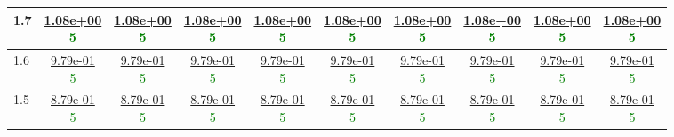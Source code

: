 \begin{table}[H]
\begin{tabular}{|l||c|c|c|c|c|c|c|c|c|}
\hline
 1.7 & \makecell{\ul{1.08e+00} \\ \textcolor{Green}{5}} & \makecell{\ul{1.08e+00} \\ \textcolor{Green}{5}} & \makecell{\ul{1.08e+00} \\ \textcolor{Green}{5}} & \makecell{\ul{1.08e+00} \\ \textcolor{Green}{5}} & \makecell{\ul{1.08e+00} \\ \textcolor{Green}{5}} & \makecell{\ul{1.08e+00} \\ \textcolor{Green}{5}} & \makecell{\ul{1.08e+00} \\ \textcolor{Green}{5}} & \makecell{\ul{1.08e+00} \\ \textcolor{Green}{5}} & \makecell{\ul{1.08e+00} \\ \textcolor{Green}{5}} \\
\hline
 1.6 & \makecell{\ul{9.79e-01} \\ \textcolor{Green}{5}} & \makecell{\ul{9.79e-01} \\ \textcolor{Green}{5}} & \makecell{\ul{9.79e-01} \\ \textcolor{Green}{5}} & \makecell{\ul{9.79e-01} \\ \textcolor{Green}{5}} & \makecell{\ul{9.79e-01} \\ \textcolor{Green}{5}} & \makecell{\ul{9.79e-01} \\ \textcolor{Green}{5}} & \makecell{\ul{9.79e-01} \\ \textcolor{Green}{5}} & \makecell{\ul{9.79e-01} \\ \textcolor{Green}{5}} & \makecell{\ul{9.79e-01} \\ \textcolor{Green}{5}} \\
\hline
 1.5 & \makecell{\ul{8.79e-01} \\ \textcolor{Green}{5}} & \makecell{\ul{8.79e-01} \\ \textcolor{Green}{5}} & \makecell{\ul{8.79e-01} \\ \textcolor{Green}{5}} & \makecell{\ul{8.79e-01} \\ \textcolor{Green}{5}} & \makecell{\ul{8.79e-01} \\ \textcolor{Green}{5}} & \makecell{\ul{8.79e-01} \\ \textcolor{Green}{5}} & \makecell{\ul{8.79e-01} \\ \textcolor{Green}{5}} & \makecell{\ul{8.79e-01} \\ \textcolor{Green}{5}} & \makecell{\ul{8.79e-01} \\ \textcolor{Green}{5}} \\

\end{tabular}
\end{table}
